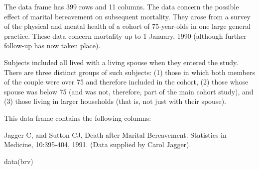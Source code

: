 \begin{Description}\relax
The  data frame has 399 rows and 11 columns.
The data concern the possible effect of marital bereavement on
subsequent mortality. They arose from a survey of the physical and
mental health of a cohort of 75-year-olds in one large general
practice. These data concern mortality up to 1 January, 1990 (although
further follow-up has now taken place).

Subjects included all lived with a living spouse when they entered the
study. There are three distinct groups of such subjects: (1) those in
which both members of the couple were over 75 and therefore included in
the cohort, (2) those whose spouse was below 75 (and was not, therefore,
part of the main cohort study), and (3) those living in larger
households (that is, not just with their spouse).
\end{Description}
\begin{Format}\relax
This data frame contains the following columns:
\end{Format}
\begin{Source}\relax
Jagger C, and Sutton CJ, Death after Marital Bereavement. Statistics in
Medicine, 10:395-404, 1991. (Data supplied by Carol Jagger).
\end{Source}
\begin{Examples}
\begin{ExampleCode}
data(brv)
\end{ExampleCode}
\end{Examples}

